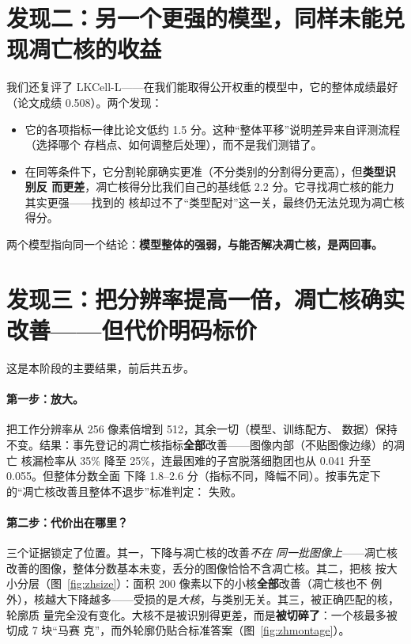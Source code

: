 \documentclass[11pt]{article}
\begin{document}
\section*{发现二：另一个更强的模型，同样未能兑现凋亡核的收益}

我们还复评了 LKCell-L——在我们能取得公开权重的模型中，它的整体成绩最好（论文成绩
0.508）。两个发现：

\begin{itemize}
\item 它的各项指标一律比论文低约 1.5 分。这种“整体平移”说明差异来自评测流程（选择哪个
      存档点、如何调整后处理），而不是我们测错了。
\item 在同等条件下，它分割轮廓确实更准（不分类别的分割得分更高），但\textbf{类型识别反
      而更差}，凋亡核得分比我们自己的基线低 2.2 分。它寻找凋亡核的能力其实更强——找到的
      核却过不了“类型配对”这一关，最终仍无法兑现为凋亡核得分。
\end{itemize}

两个模型指向同一个结论：\textbf{模型整体的强弱，与能否解决凋亡核，是两回事。}

\section*{发现三：把分辨率提高一倍，凋亡核确实改善——但代价明码标价}

这是本阶段的主要结果，前后共五步。

\paragraph{第一步：放大。}把工作分辨率从 256 像素倍增到 512，其余一切（模型、训练配方、
数据）保持不变。结果：事先登记的凋亡核指标\textbf{全部}改善——图像内部（不贴图像边缘）的凋亡
核漏检率从 35\% 降至 25\%，连最困难的子宫脱落细胞团也从 0.041 升至 0.055。但整体分数全面
下降 1.8--2.6 分（指标不同，降幅不同）。按事先定下的“凋亡核改善且整体不退步”标准判定：
失败。

\paragraph{第二步：代价出在哪里？}三个证据锁定了位置。其一，下降与凋亡核的改善\emph{不在
同一批图像上}——凋亡核改善的图像，整体分数基本未变，丢分的图像恰恰不含凋亡核。其二，把核
按大小分层（图~\ref{fig:zhsize}）：面积 200 像素以下的小核\textbf{全部}改善（凋亡核也不
例外），核越大下降越多——受损的是\emph{大核}，与类别无关。其三，被正确匹配的核，轮廓质
量完全没有变化。大核不是被识别得更差，而是\textbf{被切碎了}：一个核最多被切成 7 块“马赛
克”，而外轮廓仍贴合标准答案（图~\ref{fig:zhmontage}）。
\end{document}
